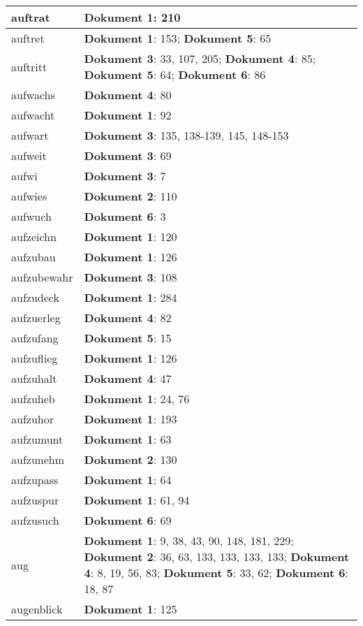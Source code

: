 \documentclass[a5paper]{article}
\begin{document}
\begin{longtable}[l]{|l|p{3in}|}
\hline
auftrat & \textbf{Dokument 1}: 210 \\
\hline
auftret & \textbf{Dokument 1}: 153; \textbf{Dokument 5}: 65 \\
\hline
auftritt & \textbf{Dokument 3}: 33, 107, 205; \textbf{Dokument 4}: 85; \textbf{Dokument 5}: 64; \textbf{Dokument 6}: 86 \\
\hline
aufwachs & \textbf{Dokument 4}: 80 \\
\hline
aufwacht & \textbf{Dokument 1}: 92 \\
\hline
aufwart & \textbf{Dokument 3}: 135, 138-139, 145, 148-153 \\
\hline
aufweit & \textbf{Dokument 3}: 69 \\
\hline
aufwi & \textbf{Dokument 3}: 7 \\
\hline
aufwies & \textbf{Dokument 2}: 110 \\
\hline
aufwuch & \textbf{Dokument 6}: 3 \\
\hline
aufzeichn & \textbf{Dokument 1}: 120 \\
\hline
aufzubau & \textbf{Dokument 1}: 126 \\
\hline
aufzubewahr & \textbf{Dokument 3}: 108 \\
\hline
aufzudeck & \textbf{Dokument 1}: 284 \\
\hline
aufzuerleg & \textbf{Dokument 4}: 82 \\
\hline
aufzufang & \textbf{Dokument 5}: 15 \\
\hline
aufzuflieg & \textbf{Dokument 1}: 126 \\
\hline
aufzuhalt & \textbf{Dokument 4}: 47 \\
\hline
aufzuheb & \textbf{Dokument 1}: 24, 76 \\
\hline
aufzuhor & \textbf{Dokument 1}: 193 \\
\hline
aufzumunt & \textbf{Dokument 1}: 63 \\
\hline
aufzunehm & \textbf{Dokument 2}: 130 \\
\hline
aufzupass & \textbf{Dokument 1}: 64 \\
\hline
aufzuspur & \textbf{Dokument 1}: 61, 94 \\
\hline
aufzusuch & \textbf{Dokument 6}: 69 \\
\hline
aug & \textbf{Dokument 1}: 9, 38, 43, 90, 148, 181, 229; \textbf{Dokument 2}: 36, 63, 133, 133, 133, 133; \textbf{Dokument 4}: 8, 19, 56, 83; \textbf{Dokument 5}: 33, 62; \textbf{Dokument 6}: 18, 87 \\
\hline
augenblick & \textbf{Dokument 1}: 125 \\

\end{longtable}
\end{document}
